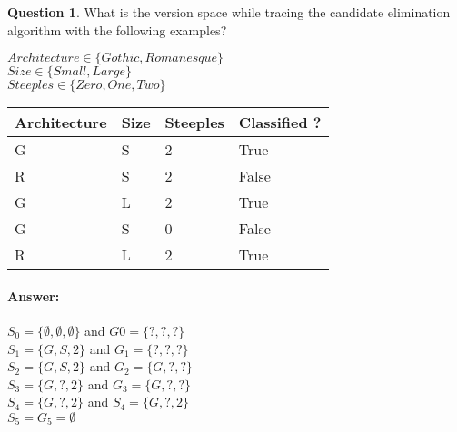 \documentclass[11pt,a4paper]{article}
\theoremstyle{definition}%
\newtheorem{Q}{Question}[] %
\newcommand{\reponse}[1]{%
\ifthenelse {\boolean{corrige}} {\paragraph{Answer:} \color{darkblue}   #1\color{black}} {}
}
\begin{document}
\begin{Q}
What is the version space while tracing the candidate elimination algorithm with the
following examples?

$Architecture \in \{Gothic, Romanesque\}$ \\
$Size \in \{Small, Large\}$ \\
$Steeples \in \{Zero, One, Two\}$ \\
\begin{center}
\begin{tabular}{|l|l|l|l|}
\hline
\textbf{Architecture} & \textbf{Size} & \textbf{Steeples} & \textbf{Classified ?} \\ \hline
G                     & S             & 2                 & True                  \\ \hline
R                     & S             & 2                 & False                 \\ \hline
G                     & L             & 2                 & True                  \\ \hline
G                     & S             & 0                 & False                 \\ \hline
R                     & L             & 2                 & True                  \\ \hline
\end{tabular}
\end{center}


\reponse{
$S_0 = \{\emptyset, \emptyset, \emptyset\}$ and $G0 = \{?, ?, ?\}$\\
$S_1 = \{G, S, 2\}$ and $G_1 = \{?, ?, ?\}$\\
$S_2 = \{G, S, 2\}$ and $G_2 = \{G, ?, ?\}$\\
$S_3 = \{G, ?, 2\}$ and $G_3 = \{G, ?, ?\}$\\
$S_4 = \{G, ?, 2\}$ and $S_4 = \{G, ?, 2\}$\\
$S_5 = G_5 = \emptyset$\\

}
\end{Q}
\end{document}
